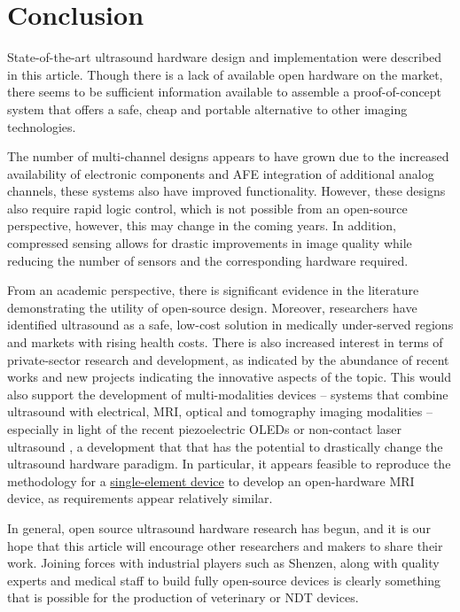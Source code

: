 \documentclass{article}
\begin{document}
\newpage
\section{Conclusion}

State-of-the-art ultrasound hardware design and implementation were described in this article. Though there is a lack of available open hardware on the market, there seems to be sufficient information available to assemble a proof-of-concept system that offers a safe, cheap and portable alternative to other imaging technologies.

The number of multi-channel designs appears to have grown due to the increased availability of electronic components and AFE integration of additional analog channels, these systems also have improved functionality. However, these designs also require rapid logic control, which is not possible from an open-source perspective, however, this may change in the coming years. In addition, compressed sensing allows for drastic improvements in image quality while reducing the number of sensors and the corresponding hardware required. 

From an academic perspective, there is significant evidence in the literature demonstrating the utility of open-source design. Moreover, researchers have identified ultrasound as a safe, low-cost solution in medically under-served regions and markets with rising health costs. There is also increased interest in terms of private-sector research and development, as indicated by the abundance of recent works and new projects indicating the innovative aspects of the topic. This would also support the development of multi-modalities devices -- systems that combine ultrasound with electrical, MRI, optical and tomography imaging modalities -- especially in light of the recent piezoelectric OLEDs \cite{yu_direct_2020} or non-contact laser ultrasound \cite{zhang_full_2019}, a development that that has the potential to drastically change the ultrasound hardware paradigm. In particular, it appears feasible to reproduce the methodology for a \href{http://un0rick.cc}{single-element device} to develop an open-hardware MRI device, as requirements appear relatively similar.

In general, open source ultrasound hardware research \cite{roman_open-source_2019} has begun, and it is our hope that this article will encourage other researchers and makers to share their work. Joining forces with industrial players such as Shenzen, along with quality experts and medical staff to build fully open-source devices is clearly something that is possible for the production of veterinary or NDT devices.
\end{document}
